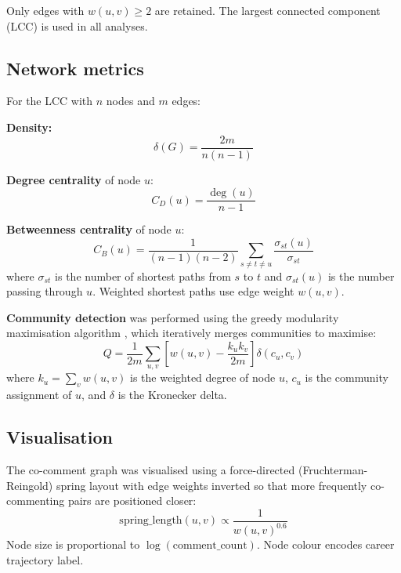 \documentclass[12pt,a4paper]{article}
\begin{document}
Only edges with $w(u,v) \geq 2$ are retained.
The largest connected component (LCC) is used in all analyses.

\subsection{Network metrics}

For the LCC with $n$ nodes and $m$ edges:

\textbf{Density:}
\begin{equation}
  \delta(G) = \frac{2m}{n(n-1)}
\end{equation}

\textbf{Degree centrality} of node $u$:
\begin{equation}
  C_D(u) = \frac{\deg(u)}{n-1}
\end{equation}

\textbf{Betweenness centrality} of node $u$:
\begin{equation}
  C_B(u) = \frac{1}{(n-1)(n-2)}
  \sum_{s \neq t \neq u}
  \frac{\sigma_{st}(u)}{\sigma_{st}}
\end{equation}
where $\sigma_{st}$ is the number of shortest paths from $s$ to $t$
and $\sigma_{st}(u)$ is the number passing through $u$.
Weighted shortest paths use edge weight $w(u,v)$.

\textbf{Community detection} was performed using the greedy
modularity maximisation algorithm \citep{Clauset2004}, which
iteratively merges communities to maximise:
\begin{equation}
  Q = \frac{1}{2m} \sum_{u,v}
  \left[w(u,v) - \frac{k_u k_v}{2m}\right]
  \delta(c_u, c_v)
\end{equation}
where $k_u = \sum_v w(u,v)$ is the weighted degree of node $u$,
$c_u$ is the community assignment of $u$, and $\delta$ is the
Kronecker delta.

\subsection{Visualisation}

The co-comment graph was visualised using a force-directed
(Fruchterman-Reingold) spring layout \citep{Fruchterman1991}
with edge weights inverted so that more frequently co-commenting
pairs are positioned closer:
\begin{equation}
  \text{spring\_length}(u,v) \propto \frac{1}{w(u,v)^{0.6}}
\end{equation}
Node size is proportional to $\log(\text{comment\_count})$.
Node colour encodes career trajectory label.
\end{document}

